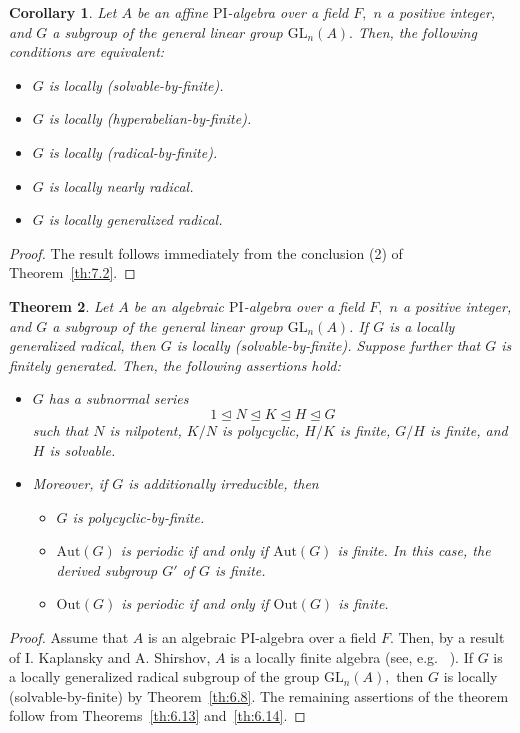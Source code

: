 \documentclass{amsart}
\newtheorem{theorem}{Theorem}[section]
\newtheorem{corollary}[theorem]{Corollary}
\theoremstyle{definition}
\begin{document}
\begin{corollary}\label{cor:7.3} Let $A$ be an affine $\mathrm{PI}$-algebra over a field $F,$  $n$ a positive integer, and $G$ a subgroup of the general linear group $\mathrm{GL}_n(A).$ Then, the following conditions are equivalent:
	\begin{itemize}
		\item [(1)] $G$ is locally (solvable-by-finite).
		\item [(2)] $G$ is locally (hyperabelian-by-finite).
		\item [(3)] $G$ is locally (radical-by-finite).
		\item [(4)] $G$ is locally nearly radical.
		\item [(5)] $G$ is locally generalized radical.
	\end{itemize}
\end{corollary}
\begin{proof} The result  follows immediately from the conclusion (2) of Theorem~\ref{th:7.2}.
\end{proof}
\begin{theorem}\label{th:7.4} Let $A$ be an algebraic $\mathrm{PI}$-algebra over a field $F,$  $n$ a positive integer, and $G$ a subgroup of the general linear group $\mathrm{GL}_n(A)$. If $G$ is a locally generalized radical, then $G$ is locally (solvable-by-finite). Suppose further that $G$ is finitely generated.  Then, the following assertions hold:
	\begin{itemize}
		\item [(1)] $G$ has a subnormal series $$1\trianglelefteq N\trianglelefteq K\trianglelefteq H\trianglelefteq G$$
		such that $N$ is nilpotent, $K/N$ is polycyclic, $H/K$ is finite, $G/H$ is finite, and $H$ is solvable.
		\item [(2)] Moreover, if $G$ is additionally irreducible, then 
		  \begin{itemize}
		  	\item [(a)] $G$ is polycyclic-by-finite.
		  	\item [(b)] $\mathrm{Aut}(G)$ is periodic if and only if $\mathrm{Aut}(G)$ is finite. In this case, the derived subgroup $G'$ of $G$ is finite.
		  	\item [(c)] $\mathrm{Out}(G)$ is periodic if and only if $\mathrm{Out}(G)$ is finite.
		  \end{itemize}
	\end{itemize}
\end{theorem}
\begin{proof} Assume that $A$ is an algebraic $\mathrm{PI}$-algebra over a field $F.$ Then, by a result of I. Kaplansky and A. Shirshov, $A$ is a locally finite algebra (see, e.g. ~\cite[Ch.~10, \S12, Theorem 1]{Bo_Jacobson_1964}). If $G$ is a locally generalized radical subgroup of the  group $\mathrm{GL}_n(A),$ then $G$ is locally (solvable-by-finite) by Theorem~\ref{th:6.8}. The remaining assertions of the theorem follow from Theorems~\ref{th:6.13} and~\ref{th:6.14}.
\end{proof}
\end{document}
